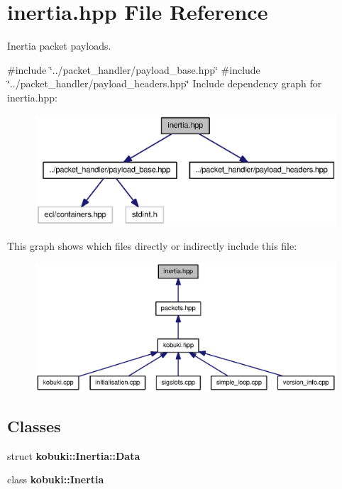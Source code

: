 \section{inertia.\-hpp \-File \-Reference}
\label{inertia_8hpp}


\-Inertia packet payloads.  


{\ttfamily \#include \char`\"{}../packet\-\_\-handler/payload\-\_\-base.\-hpp\char`\"{}}\*
{\ttfamily \#include \char`\"{}../packet\-\_\-handler/payload\-\_\-headers.\-hpp\char`\"{}}\*
\-Include dependency graph for inertia.\-hpp\-:
\nopagebreak
\begin{figure}[H]
\begin{center}
\leavevmode
\includegraphics[width=350pt]{inertia_8hpp__incl}
\end{center}
\end{figure}
\-This graph shows which files directly or indirectly include this file\-:
\nopagebreak
\begin{figure}[H]
\begin{center}
\leavevmode
\includegraphics[width=350pt]{inertia_8hpp__dep__incl}
\end{center}
\end{figure}
\subsection*{\-Classes}
\begin{DoxyCompactItemize}
\item 
struct {\bf kobuki\-::\-Inertia\-::\-Data}
\item 
class {\bf kobuki\-::\-Inertia}
\end{DoxyCompactItemize}
